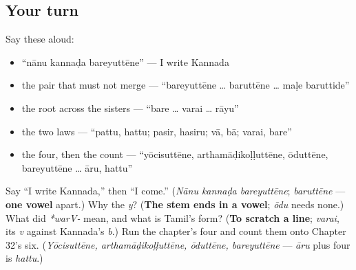 \subsection*{Your turn}
Say these aloud:

\begin{itemize}
\raggedright
  \item \textquotedblleft{}nānu kannaḍa bareyuttēne\textquotedblright{} — I write Kannada
  \item the pair that must not merge — \textquotedblleft{}bareyuttēne … baruttēne … maḷe baruttide\textquotedblright{}
  \item the root across the sisters — \textquotedblleft{}bare … varai … rāyu\textquotedblright{}
  \item the two laws — \textquotedblleft{}pattu, hattu; pasir, hasiru; vā, bā; varai, bare\textquotedblright{}
  \item the four, then the count — \textquotedblleft{}yōcisuttēne, arthamāḍikoḷḷuttēne, ōduttēne, bareyuttēne … āru, hattu\textquotedblright{}
\end{itemize}

\begin{tcolorbox}[breakable,colback=teal!4,colframe=teal!35!black,title={Before you move on}]
Say \textquotedblleft{}I write Kannada,\textquotedblright{} then \textquotedblleft{}I come.\textquotedblright{} (\emph{Nānu kannaḍa bareyuttēne}; \emph{baruttēne} — \textbf{one vowel} apart.) Why the \emph{y}? (\textbf{The stem ends in a vowel}; \emph{ōdu} needs none.) What did \emph{*warV‑} mean, and what is Tamil's form? (\textbf{To scratch a line}; \emph{varai}, its \emph{v} against Kannada's \emph{b}.) Run the chapter's four and count them onto Chapter 32's six. (\emph{Yōcisuttēne, arthamāḍikoḷḷuttēne, ōduttēne, bareyuttēne} — \emph{āru} plus four is \emph{hattu}.)
\end{tcolorbox}
